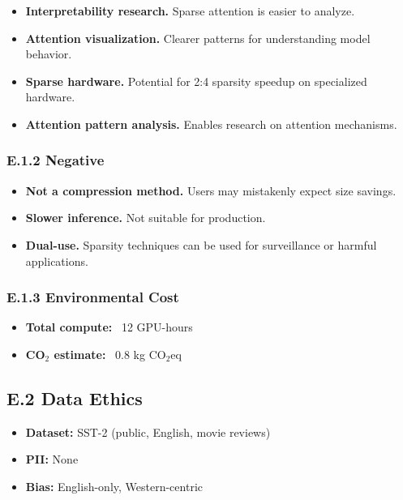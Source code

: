\begin{itemize}
\item \textbf{Interpretability research.} Sparse attention is easier to analyze.
\item \textbf{Attention visualization.} Clearer patterns for understanding model behavior.
\item \textbf{Sparse hardware.} Potential for 2:4 sparsity speedup on specialized hardware.
\item \textbf{Attention pattern analysis.} Enables research on attention mechanisms.

\end{itemize}
\subsubsection{E.1.2 Negative}

\begin{itemize}
\item \textbf{Not a compression method.} Users may mistakenly expect size savings.
\item \textbf{Slower inference.} Not suitable for production.
\item \textbf{Dual-use.} Sparsity techniques can be used for surveillance or harmful
  applications.

\end{itemize}
\subsubsection{E.1.3 Environmental Cost}

\begin{itemize}
\item \textbf{Total compute:} ~12 GPU-hours
\item \textbf{CO$_2$ estimate:} ~0.8 kg CO$_2$eq

\end{itemize}
\subsection{E.2 Data Ethics}

\begin{itemize}
\item \textbf{Dataset:} SST-2 (public, English, movie reviews)
\item \textbf{PII:} None
\item \textbf{Bias:} English-only, Western-centric

\end{itemize}

